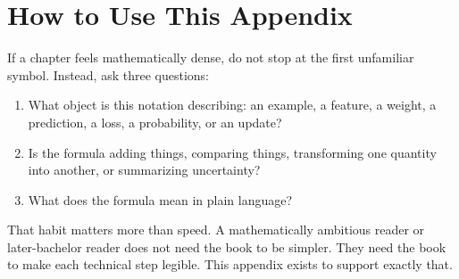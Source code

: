 \section{How to Use This Appendix}

If a chapter feels mathematically dense, do not stop at the first unfamiliar symbol. Instead, ask three questions:
\begin{enumerate}[leftmargin=*]
\item What object is this notation describing: an example, a feature, a weight, a prediction, a loss, a probability, or an update?
\item Is the formula adding things, comparing things, transforming one quantity into another, or summarizing uncertainty?
\item What does the formula mean in plain language?
\end{enumerate}

That habit matters more than speed. A mathematically ambitious reader or later-bachelor reader does not need the book to be simpler. They need the book to make each technical step legible. This appendix exists to support exactly that.
